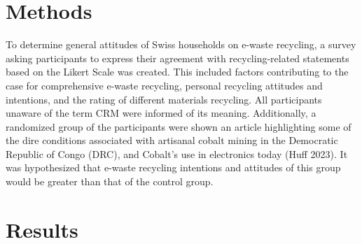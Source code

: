 \documentclass[
  letterpaper,
  DIV=11,
  numbers=noendperiod]{scrartcl}
\begin{document}
\section{Methods}\label{methods}

To determine general attitudes of Swiss households on e-waste recycling,
a survey asking participants to express their agreement with
recycling-related statements based on the Likert Scale was created. This
included factors contributing to the case for comprehensive e-waste
recycling, personal recycling attitudes and intentions, and the rating
of different materials recycling. All participants unaware of the term
CRM were informed of its meaning. Additionally, a randomized group of
the participants were shown an article highlighting some of the dire
conditions associated with artisanal cobalt mining in the Democratic
Republic of Congo (DRC), and Cobalt's use in electronics today (Huff
2023). It was hypothesized that e-waste recycling intentions and
attitudes of this group would be greater than that of the control group.

\section{Results}\label{results}
\end{document}
